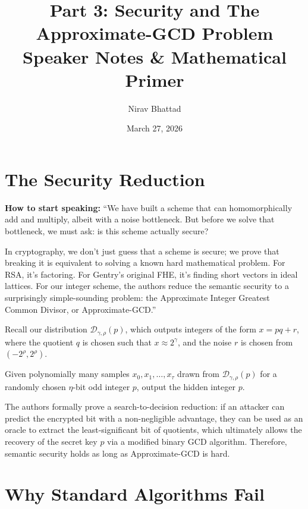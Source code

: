 \documentclass[11pt]{article}
\author{Nirav Bhattad}
\date{March 27, 2026}
\title{Part 3: Security and The Approximate-GCD Problem \\ \large Speaker Notes \& Mathematical Primer}
\begin{document}
\maketitle

\section{The Security Reduction}

\begin{speakernote}
\textbf{How to start speaking:} 
``We have built a scheme that can homomorphically add and multiply, albeit with a noise bottleneck. But before we solve that bottleneck, we must ask: is this scheme actually secure? 

In cryptography, we don't just guess that a scheme is secure; we prove that breaking it is equivalent to solving a known hard mathematical problem. For RSA, it's factoring. For Gentry's original FHE, it's finding short vectors in ideal lattices. For our integer scheme, the authors reduce the semantic security to a surprisingly simple-sounding problem: the Approximate Integer Greatest Common Divisor, or Approximate-GCD.''
\end{speakernote}

Recall our distribution $\mathcal{D}_{\gamma,\rho}(p)$, which outputs integers of the form $x = pq + r$, where the quotient $q$ is chosen such that $x \approx 2^\gamma$, and the noise $r$ is chosen from $(-2^\rho, 2^\rho)$.

\begin{definition}
Given polynomially many samples $x_0, x_1, \dots, x_\tau$ drawn from $\mathcal{D}_{\gamma,\rho}(p)$ for a randomly chosen $\eta$-bit odd integer $p$, output the hidden integer $p$.
\end{definition}

The authors formally prove a search-to-decision reduction: if an attacker can predict the encrypted bit with a non-negligible advantage, they can be used as an oracle to extract the least-significant bit of quotients, which ultimately allows the recovery of the secret key $p$ via a modified binary GCD algorithm. Therefore, semantic security holds as long as Approximate-GCD is hard.

\section{Why Standard Algorithms Fail}
\end{document}
